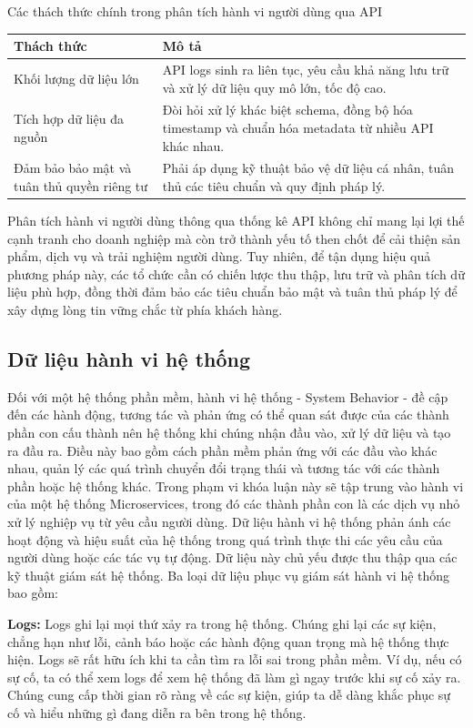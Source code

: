 \documentclass{uetgraduation}
\begin{document}
\begin{table}[H]{Các thách thức chính trong phân tích hành vi người dùng qua API}
\centering
\begin{tabular}{|p{5cm}|p{8cm}|}
\hline
\textbf{Thách thức} & \textbf{Mô tả} \\
\hline
Khối lượng dữ liệu lớn & API logs sinh ra liên tục, yêu cầu khả năng lưu trữ và xử lý dữ liệu quy mô lớn, tốc độ cao. \\
\hline
Tích hợp dữ liệu đa nguồn & Đòi hỏi xử lý khác biệt schema, đồng bộ hóa timestamp và chuẩn hóa metadata từ nhiều API khác nhau. \\
\hline
Đảm bảo bảo mật và tuân thủ quyền riêng tư & Phải áp dụng kỹ thuật bảo vệ dữ liệu cá nhân, tuân thủ các tiêu chuẩn và quy định pháp lý. \\
\hline
\end{tabular}
\label{tab:hvndapi}
\end{table}

Phân tích hành vi người dùng thông qua thống kê API không chỉ mang lại lợi thế cạnh tranh cho doanh nghiệp mà còn trở thành yếu tố then chốt để cải thiện sản phẩm, dịch vụ và trải nghiệm người dùng. Tuy nhiên, để tận dụng hiệu quả phương pháp này, các tổ chức cần có chiến lược thu thập, lưu trữ và phân tích dữ liệu phù hợp, đồng thời đảm bảo các tiêu chuẩn bảo mật và tuân thủ pháp lý để xây dựng lòng tin vững chắc từ phía khách hàng.

\subsection{Dữ liệu hành vi hệ thống}
Đối với một hệ thống phần mềm, hành vi hệ thống - System Behavior \cite{sysbe} - đề cập đến các hành động, tương tác và phản ứng có thể quan sát được của các thành phần con cấu thành nên hệ thống khi chúng nhận đầu vào, xử lý dữ liệu và tạo ra đầu ra. Điều này bao gồm cách phần mềm phản ứng với các đầu vào khác nhau, quản lý các quá trình chuyển đổi trạng thái và tương tác với các thành phần hoặc hệ thống khác. Trong phạm vi khóa luận này sẽ tập trung vào hành vi của một hệ thống Microservices, trong đó các thành phần con là các dịch vụ nhỏ xử lý nghiệp vụ từ yêu cầu người dùng. Dữ liệu hành vi hệ thống phản ánh các hoạt động và hiệu suất của hệ thống trong quá trình thực thi các yêu cầu của người dùng hoặc các tác vụ tự động. Dữ liệu này chủ yếu được thu thập qua các kỹ thuật giám sát hệ thống. Ba loại dữ liệu phục vụ giám sát hành vi hệ thống bao gồm:

\textbf{Logs:} Logs ghi lại mọi thứ xảy ra trong hệ thống. Chúng ghi lại các sự kiện, chẳng hạn như lỗi, cảnh báo hoặc các hành động quan trọng mà hệ thống thực hiện. Logs sẽ rất hữu ích khi ta cần tìm ra lỗi sai trong phần mềm.
Ví dụ, nếu có sự cố, ta có thể xem logs để xem hệ thống đã làm gì ngay trước khi sự cố xảy ra. Chúng cung cấp thời gian rõ ràng về các sự kiện, giúp ta dễ dàng khắc phục sự cố và hiểu những gì đang diễn ra bên trong hệ thống.
\end{document}

